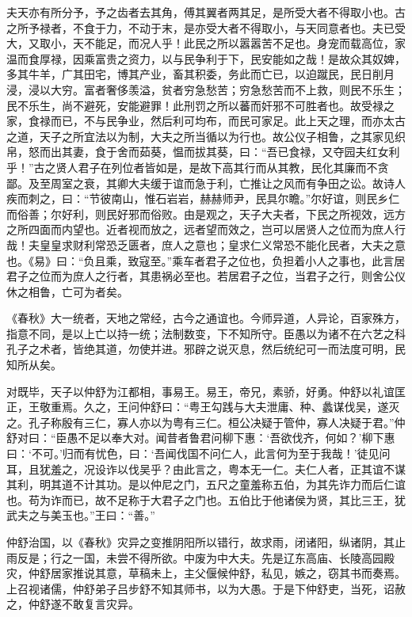 \documentclass[12pt,UTF8]{ctexbook}
\begin{document}
夫天亦有所分予，予之齿者去其角，傅其翼者两其足，是所受大者不得取小也。古之所予禄者，不食于力，不动于末，是亦受大者不得取小，与天同意者也。夫已受大，又取小，天不能足，而况人乎！此民之所以嚣嚣苦不足也。身宠而载高位，家温而食厚禄，因乘富贵之资力，以与民争利于下，民安能如之哉！是故众其奴婢，多其牛羊，广其田宅，博其产业，畜其积委，务此而亡已，以迫蹴民，民日削月浸，浸以大穷。富者奢侈羡溢，贫者穷急愁苦；穷急愁苦而不上救，则民不乐生；民不乐生，尚不避死，安能避罪！此刑罚之所以蕃而奸邪不可胜者也。故受禄之家，食禄而已，不与民争业，然后利可均布，而民可家足。此上天之理，而亦太古之道，天子之所宜法以为制，大夫之所当循以为行也。故公仪子相鲁，之其家见织帛，怒而出其妻，食于舍而茹葵，愠而拔其葵，曰：“吾已食禄，又夺园夫红女利乎！”古之贤人君子在列位者皆如是，是故下高其行而从其教，民化其廉而不贪鄙。及至周室之衰，其卿大夫缓于谊而急于利，亡推让之风而有争田之讼。故诗人疾而刺之，曰：“节彼南山，惟石岩岩，赫赫师尹，民具尔瞻。”尔好谊，则民乡仁而俗善；尔好利，则民好邪而俗败。由是观之，天子大夫者，下民之所视效，远方之所四面而内望也。近者视而放之，远者望而效之，岂可以居贤人之位而为庶人行哉！夫皇皇求财利常恐乏匮者，庶人之意也；皇求仁义常恐不能化民者，大夫之意也。《易》曰：“负且乘，致寇至。”乘车者君子之位也，负担着小人之事也，此言居君子之位而为庶人之行者，其患祸必至也。若居君子之位，当君子之行，则舍公仪休之相鲁，亡可为者矣。



《春秋》大一统者，天地之常经，古今之通谊也。今师异道，人异论，百家殊方，指意不同，是以上亡以持一统；法制数变，下不知所守。臣愚以为诸不在六艺之科孔子之术者，皆绝其道，勿使并进。邪辟之说灭息，然后统纪可一而法度可明，民知所从矣。



对既毕，天子以仲舒为江都相，事易王。易王，帝兄，素骄，好勇。仲舒以礼谊匡正，王敬重焉。久之，王问仲舒曰：“粤王勾践与大夫泄庸、种、蠡谋伐吴，遂灭之。孔子称殷有三仁，寡人亦以为粤有三仁。桓公决疑于管仲，寡人决疑于君。”仲舒对曰：“臣愚不足以奉大对。闻昔者鲁君问柳下惠：‘吾欲伐齐，何如？’柳下惠曰：‘不可。’归而有忧色，曰：‘吾闻伐国不问仁人，此言何为至于我哉！’徒见问耳，且犹羞之，况设诈以伐吴乎？由此言之，粤本无一仁。夫仁人者，正其谊不谋其利，明其道不计其功。是以仲尼之门，五尺之童羞称五伯，为其先诈力而后仁谊也。苟为诈而已，故不足称于大君子之门也。五伯比于他诸侯为贤，其比三王，犹武夫之与美玉也。”王曰：“善。”



仲舒治国，以《春秋》灾异之变推阴阳所以错行，故求雨，闭诸阳，纵诸阴，其止雨反是；行之一国，未尝不得所欲。中废为中大夫。先是辽东高庙、长陵高园殿灾，仲舒居家推说其意，草稿未上，主父偃候仲舒，私见，嫉之，窃其书而奏焉。上召视诸儒，仲舒弟子吕步舒不知其师书，以为大愚。于是下仲舒吏，当死，诏赦之，仲舒遂不敢复言灾异。
\end{document}
